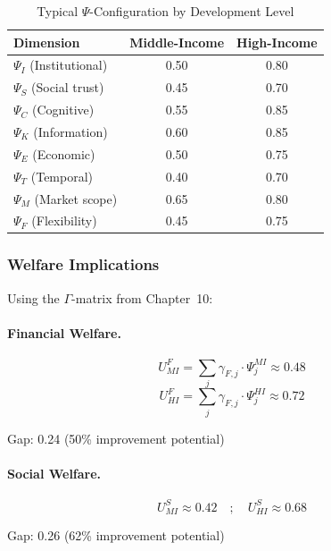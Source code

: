 \begin{table}[htbp]
\centering
\caption{Typical $\Psi$-Configuration by Development Level}
\label{tab:psi-by-income}
\begin{tabular}{@{}lcc@{}}
\toprule
\textbf{Dimension} & \textbf{Middle-Income} & \textbf{High-Income} \\
\midrule
$\Psi_I$ (Institutional) & 0.50 & 0.80 \\
$\Psi_S$ (Social trust) & 0.45 & 0.70 \\
$\Psi_C$ (Cognitive) & 0.55 & 0.85 \\
$\Psi_K$ (Information) & 0.60 & 0.85 \\
$\Psi_E$ (Economic) & 0.50 & 0.75 \\
$\Psi_T$ (Temporal) & 0.40 & 0.70 \\
$\Psi_M$ (Market scope) & 0.65 & 0.80 \\
$\Psi_F$ (Flexibility) & 0.45 & 0.75 \\
\bottomrule
\end{tabular}
\end{table}

\subsubsection{Welfare Implications}

Using the $\Gamma$-matrix from Chapter~10:

\paragraph{Financial Welfare.}
\begin{equation}
U^F_{MI} = \sum_j \gamma_{F,j} \cdot \Psi_j^{MI} \approx 0.48
\end{equation}
\begin{equation}
U^F_{HI} = \sum_j \gamma_{F,j} \cdot \Psi_j^{HI} \approx 0.72
\end{equation}

Gap: 0.24 (50\% improvement potential)

\paragraph{Social Welfare.}
\begin{equation}
U^S_{MI} \approx 0.42 \quad ; \quad U^S_{HI} \approx 0.68
\end{equation}

Gap: 0.26 (62\% improvement potential)

